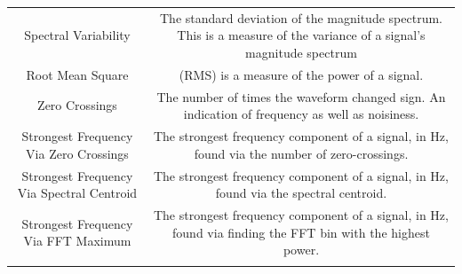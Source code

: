 \documentclass[11pt]{article}
\begin{document}
\begin{longtable}[c]{@{}cc@{}}
\begin{minipage}[t]{0.15\columnwidth}
Spectral Variability
\strut\end{minipage} &
\begin{minipage}[t]{0.79\columnwidth}\centering\strut
The standard deviation of the magnitude spectrum. This is a measure of
the variance of a signal's magnitude spectrum
\strut\end{minipage}\tabularnewline
\begin{minipage}[t]{0.15\columnwidth}\centering\strut
Root Mean Square
\strut\end{minipage} &
\begin{minipage}[t]{0.79\columnwidth}\centering\strut
(RMS) is a measure of the power of a signal.
\strut\end{minipage}\tabularnewline
\begin{minipage}[t]{0.15\columnwidth}\centering\strut
Zero Crossings
\strut\end{minipage} &
\begin{minipage}[t]{0.79\columnwidth}\centering\strut
The number of times the waveform changed sign. An indication of
frequency as well as noisiness.
\strut\end{minipage}\tabularnewline
\begin{minipage}[t]{0.15\columnwidth}\centering\strut
Strongest Frequency Via Zero Crossings
\strut\end{minipage} &
\begin{minipage}[t]{0.79\columnwidth}\centering\strut
The strongest frequency component of a signal, in Hz, found via the
number of zero-crossings.
\strut\end{minipage}\tabularnewline
\begin{minipage}[t]{0.15\columnwidth}\centering\strut
Strongest Frequency Via Spectral Centroid
\strut\end{minipage} &
\begin{minipage}[t]{0.79\columnwidth}\centering\strut
The strongest frequency component of a signal, in Hz, found via the
spectral centroid.
\strut\end{minipage}\tabularnewline
\begin{minipage}[t]{0.15\columnwidth}\centering\strut
Strongest Frequency Via FFT Maximum
\strut\end{minipage} &
\begin{minipage}[t]{0.79\columnwidth}\centering\strut
The strongest frequency component of a signal, in Hz, found via finding
the FFT bin with the highest power.
\strut\end{minipage}\tabularnewline
\begin{minipage}[t]{0.15\columnwidth}\centering\strut

\end{minipage}
\end{longtable}
\end{document}
